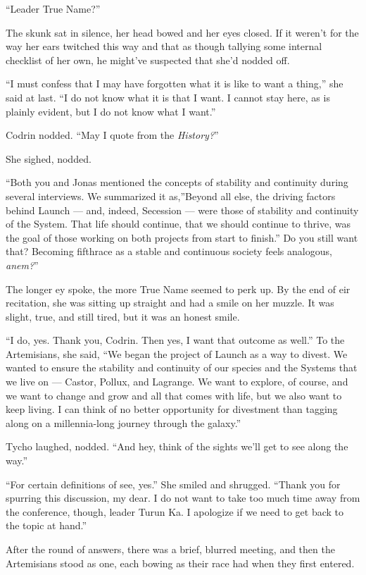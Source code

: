 ``Leader True Name?''

The skunk sat in silence, her head bowed and her eyes closed. If it weren't for the way her ears twitched this way and that as though tallying some internal checklist of her own, he might've suspected that she'd nodded off.

``I must confess that I may have forgotten what it is like to want a thing,'' she said at last. ``I do not know what it is that I want. I cannot stay here, as is plainly evident, but I do not know what I want.''

Codrin nodded. ``May I quote from the \emph{History?}''

She sighed, nodded.

``Both you and Jonas mentioned the concepts of stability and continuity during several interviews. We summarized it as,''Beyond all else, the driving factors behind Launch — and, indeed, Secession — were those of stability and continuity of the System. That life should continue, that we should continue to thrive, was the goal of those working on both projects from start to finish.'' Do you still want that? Becoming fifthrace as a stable and continuous society feels analogous, \emph{anem?}''

The longer ey spoke, the more True Name seemed to perk up. By the end of eir recitation, she was sitting up straight and had a smile on her muzzle. It was slight, true, and still tired, but it was an honest smile.

``I do, yes. Thank you, Codrin. Then yes, I want that outcome as well.'' To the Artemisians, she said, ``We began the project of Launch as a way to divest. We wanted to ensure the stability and continuity of our species and the Systems that we live on — Castor, Pollux, and Lagrange. We want to explore, of course, and we want to change and grow and all that comes with life, but we also want to keep living. I can think of no better opportunity for divestment than tagging along on a millennia-long journey through the galaxy.''

Tycho laughed, nodded. ``And hey, think of the sights we'll get to see along the way.''

``For certain definitions of see, yes.'' She smiled and shrugged. ``Thank you for spurring this discussion, my dear. I do not want to take too much time away from the conference, though, leader Turun Ka. I apologize if we need to get back to the topic at hand.''

After the round of answers, there was a brief, blurred meeting, and then the Artemisians stood as one, each bowing as their race had when they first entered.

